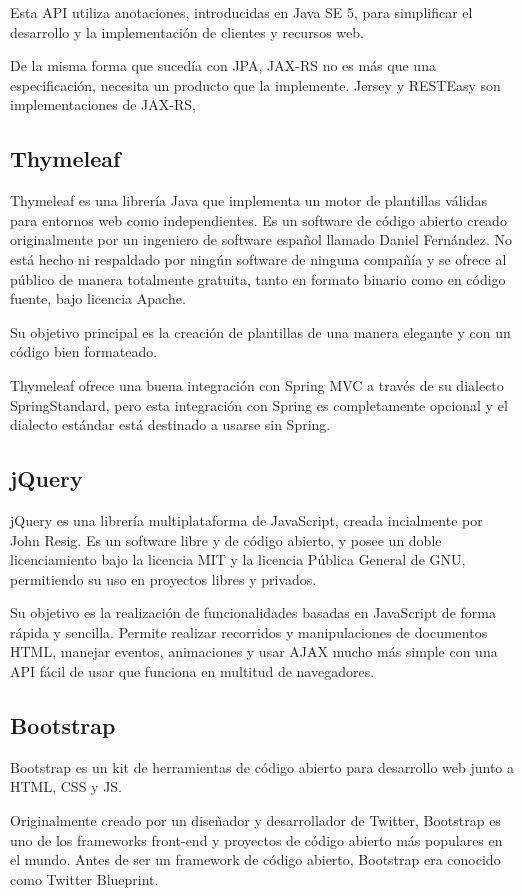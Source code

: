 Esta API utiliza anotaciones, introducidas en Java SE 5, para simplificar el desarrollo y la implementación de clientes y recursos web. 

De la misma forma que sucedía con JPA, JAX-RS no es más que una especificación, necesita un producto que la implemente. Jersey y RESTEasy son implementaciones de JAX-RS,

\subsection{Thymeleaf}
Thymeleaf es una librería Java que implementa un motor de plantillas válidas para entornos web como independientes. Es un software de código abierto creado originalmente por un ingeniero de software español llamado Daniel Fernández. No está hecho ni respaldado por ningún software de ninguna compañía y se ofrece al público de manera totalmente gratuita, tanto en formato binario como en código fuente, bajo licencia Apache.

Su objetivo principal es la creación de plantillas de una manera elegante y con un código bien formateado.

Thymeleaf ofrece una buena integración con Spring MVC a través de su dialecto SpringStandard, pero esta integración con Spring es completamente opcional y el dialecto estándar está destinado a usarse sin Spring.

\subsection{jQuery}
jQuery es una librería multiplataforma de JavaScript, creada incialmente por John Resig. Es un software libre y de código abierto, y posee un doble licenciamiento bajo la licencia MIT y la licencia Pública General de GNU, permitiendo su uso en proyectos libres y privados.

Su objetivo es la realización de funcionalidades basadas en JavaScript de forma rápida y sencilla. Permite realizar recorridos y manipulaciones de documentos HTML, manejar eventos, animaciones y usar AJAX  mucho más simple con una API fácil de usar que funciona en multitud de navegadores.

\subsection{Bootstrap}
Bootstrap es un kit de herramientas de código abierto para desarrollo web junto a HTML, CSS y JS.  

Originalmente creado por un diseñador y desarrollador de Twitter, Bootstrap es uno de los frameworks front-end y proyectos de código abierto más populares en el mundo. Antes de ser un framework de código abierto, Bootstrap era conocido como Twitter Blueprint.


